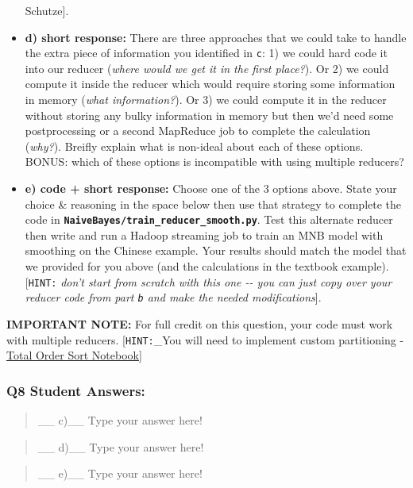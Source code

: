 \documentclass[11pt]{article}
\begin{document}
\begin{itemize}
  Schutze{]}.
\item
  \textbf{d) short response:} There are three approaches that we could
  take to handle the extra piece of information you identified in
  \texttt{c}: 1) we could hard code it into our reducer (\emph{where
  would we get it in the first place?}). Or 2) we could compute it
  inside the reducer which would require storing some information in
  memory (\emph{what information?}). Or 3) we could compute it in the
  reducer without storing any bulky information in memory but then we'd
  need some postprocessing or a second MapReduce job to complete the
  calculation (\emph{why?}). Breifly explain what is non-ideal about
  each of these options. BONUS: which of these options is incompatible
  with using multiple reducers?
\item
  \textbf{e) code + short response:} Choose one of the 3 options above.
  State your choice \& reasoning in the space below then use that
  strategy to complete the code in
  \textbf{\texttt{NaiveBayes/train\_reducer\_smooth.py}}. Test this
  alternate reducer then write and run a Hadoop streaming job to train
  an MNB model with smoothing on the Chinese example. Your results
  should match the model that we provided for you above (and the
  calculations in the textbook example). {[}\texttt{HINT:} \emph{don't
  start from scratch with this one -\/- you can just copy over your
  reducer code from part \texttt{b} and make the needed
  modifications}{]}.
\end{itemize}

    \textbf{IMPORTANT NOTE:} For full credit on this question, your code
must work with multiple reducers. {[}\texttt{HINT:}\_You will need to
implement custom partitioning -
\href{https://github.com/UCB-w261/main/tree/master/HelpfulResources/TotalSortGuide/_total-sort-guide-spark2.01-JAN27-2017.ipynb}{Total
Order Sort Notebook}{]}

    \subsubsection{Q8 Student Answers:}\label{q8-student-answers}

\begin{quote}
\_\_ c)\_\_ Type your answer here!
\end{quote}

\begin{quote}
\_\_ d)\_\_ Type your answer here!
\end{quote}

\begin{quote}
\_\_ e)\_\_ Type your answer here!
\end{quote}
\end{document}
